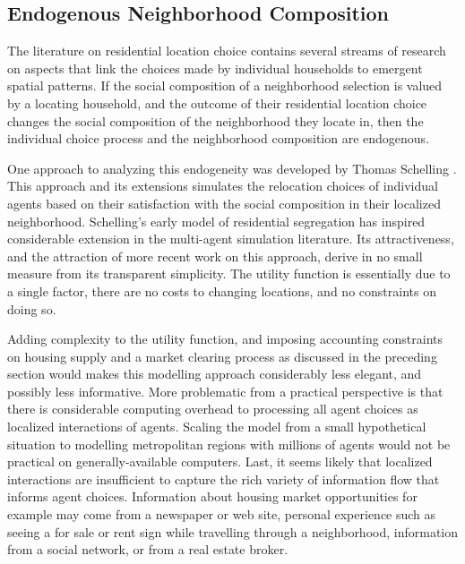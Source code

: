 \documentclass[12pt,a4paper]{article}
\begin{document}
\subsection{Endogenous Neighborhood Composition}
The literature on residential location choice contains several
streams of research on aspects that link the choices made by
individual households to emergent spatial patterns. If the social
composition of a neighborhood selection is valued by a locating
household, and the outcome of their residential location choice
changes the social composition of the neighborhood they locate in,
then the individual choice process and the neighborhood composition
are endogenous.

One approach to analyzing this endogeneity was developed by Thomas
Schelling \cite{schelling-1969,schelling-1971,schelling-1978}. This
approach and its extensions simulates the relocation choices of
individual agents based on their satisfaction with the social
composition in their localized neighborhood. Schelling's early model
of residential segregation has inspired considerable extension in
the multi-agent simulation literature.  Its attractiveness, and the
attraction of more recent work on this approach, derive in no small
measure from its transparent simplicity.  The utility function is
essentially due to a single factor, there are no costs to changing
locations, and no constraints on doing so.

Adding complexity to the utility function, and imposing accounting
constraints on housing supply and a market clearing process as
discussed in the preceding section would makes this modelling
approach considerably less elegant, and possibly less informative.
More problematic from a practical perspective is that there is
considerable computing overhead to processing all agent choices as
localized interactions of agents.  Scaling the model from a small
hypothetical situation to modelling metropolitan regions with
millions of agents would not be practical on generally-available
computers. Last, it seems likely that localized interactions are
insufficient to capture the rich variety of information flow that
informs agent choices. Information about housing market
opportunities for example may come from a newspaper or web site,
personal experience such as seeing a for sale or rent sign while
travelling through a neighborhood, information from a social
network, or from a real estate broker.
\end{document}

